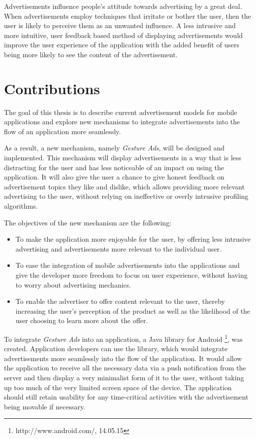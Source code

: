 Advertisements influence people's attitude towards advertising by a great deal. When advertisements employ techniques that irritate or bother the user, then the user is likely to perceive them as an unwanted influence\cite{chowdhury2010consumer}. A less intrusive and more intuitive, user feedback based method of displaying advertisements would improve the user experience of the application with the added benefit of users being more likely to see the content of the advertisement.

\section{Contributions}
The goal of this thesis is to describe current advertisement models for mobile applications and explore new mechanisms to integrate advertisements into the flow of an application more seamlessly.

As a result, a new mechanism, namely \textit{Gesture Ads}, will be designed and implemented. This mechanism will display advertisements in a way that is less distracting for the user and has less noticeable of an impact on using the application. It will also give the user a chance to give honest feedback on advertisement topics they like and dislike, which allows providing more relevant advertising to the user, without relying on ineffective or overly intrusive profiling algorithms\cite{dontkillmyads}.

The objectives of the new mechanism are the following:
\begin{itemize}
  \item To make the application more enjoyable for the user, by offering less intrusive advertising and advertisements more relevant to the individual user.
  \item To ease the integration of mobile advertisements into the applications and give the developer more freedom to focus on user experience, without having to worry about advertising mechanics.
  \item To enable the advertiser to offer content relevant to the user, thereby increasing the user's perception of the product as well as the likelihood of the user choosing to learn more about the offer.
\end{itemize}

To integrate \textit{Gesture Ads} into an application, a Java library for Android \footnote[1]{http://www.android.com/, 14.05.15}, was created. Application developers can use the library, which would integrate advertisements more seamlessly into the flow of the application. It would allow the application to receive all the necessary data via a push notification from the server and then display a very minimalist form of it to the user, without taking up too much of the very limited screen space of the device. The application should still retain usability for any time-critical activities with the advertisement being movable if necessary.

